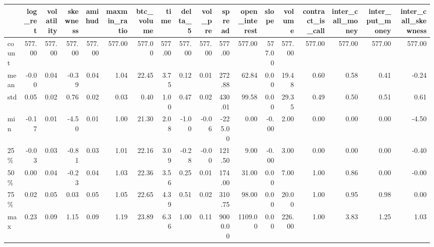 \begin{tabular}{lrrrrrrrrrrrrrrrrr}
\toprule
{} &  log\_ret &  volatility &  skewness &  amihud &  maxmin\_ratio &  btc\_volume &   time &  delta\_5 &  vol\_pre &  spread &  open\_interest &  slope &  volume &  contract\_is\_call &  inter\_call\_money &  inter\_put\_money &  inter\_call\_skewness \\
\midrule
count &   577.00 &      577.00 &    577.00 &  577.00 &        577.00 &      577.00 & 577.00 &   577.00 &   577.00 &  577.00 &         577.00 & 577.00 &  577.00 &            577.00 &            577.00 &           577.00 &               577.00 \\
mean  &    -0.00 &        0.04 &     -0.39 &    0.04 &          1.04 &       22.45 &   3.75 &     0.12 &     0.01 &  272.88 &          62.84 &   0.00 &   19.48 &              0.60 &              0.58 &             0.41 &                -0.24 \\
std   &     0.05 &        0.02 &      0.76 &    0.02 &          0.03 &        0.40 &   1.00 &     0.47 &     0.02 &  430.01 &          99.58 &   0.00 &   29.35 &              0.49 &              0.50 &             0.51 &                 0.61 \\
min   &    -0.17 &        0.01 &     -4.50 &    0.01 &          1.00 &       21.30 &   2.08 &    -1.00 &    -0.06 & -225.00 &           0.00 &  -0.00 &    2.00 &              0.00 &              0.00 &             0.00 &                -4.50 \\
25\%   &    -0.03 &        0.03 &     -0.81 &    0.03 &          1.01 &       22.16 &   3.09 &    -0.28 &    -0.00 &  121.50 &           9.00 &  -0.00 &    3.00 &              0.00 &              0.00 &             0.00 &                -0.40 \\
50\%   &     0.00 &        0.04 &     -0.23 &    0.04 &          1.03 &       22.36 &   3.56 &     0.25 &     0.01 &  174.00 &          31.00 &   0.00 &    7.00 &              1.00 &              0.86 &             0.00 &                -0.00 \\
75\%   &     0.02 &        0.05 &      0.03 &    0.05 &          1.05 &       22.65 &   4.39 &     0.51 &     0.02 &  310.75 &          98.00 &   0.00 &   20.00 &              1.00 &              0.95 &             0.98 &                 0.00 \\
max   &     0.23 &        0.09 &      1.15 &    0.09 &          1.19 &       23.89 &   6.36 &     1.00 &     0.11 & 9000.00 &        1109.00 &   0.00 &  226.00 &              1.00 &              3.83 &             1.25 &                 1.03 \\
\bottomrule
\end{tabular}
